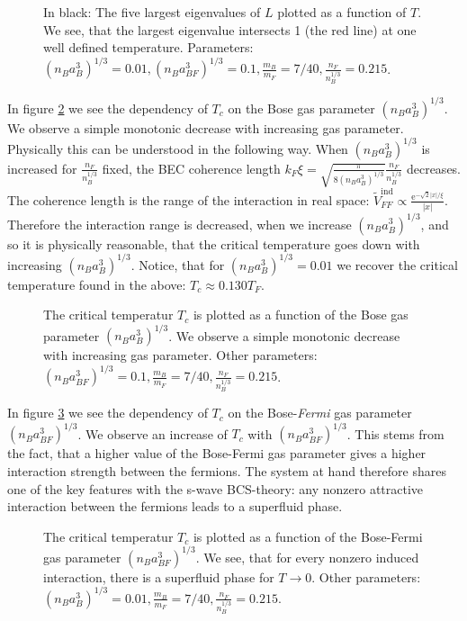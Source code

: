 \begin{figure} 
\begin{center}  
  
\caption{In black: The five largest eigenvalues of $L$ plotted as a function of $T$. We see, that the largest eigenvalue intersects 1 (the red line) at one well defined temperature. Parameters: $(n_Ba_{B}^3)^{1/3} = 0.01, (n_Ba_{BF}^3)^{1/3} = 0.1, \frac{m_B}{m_F} = 7/40, \frac{n_F}{n_B^{1/3}} = 0.215$. }
\label{fig.TCeigenvalues}  
\end{center}    
\end{figure}


In figure \ref{fig.TCrB} we see the dependency of $T_c$ on the Bose gas parameter $(n_Ba_B^3)^{1/3}$. We observe a simple monotonic decrease with increasing gas parameter. Physically this can be understood in the following way. When $(n_Ba_B^3)^{1/3}$ is increased for $\frac{n_F}{n_B^{1/3}}$ fixed, the BEC coherence length $k_F\xi = \sqrt{ \frac{\pi}{ 8(n_Ba_B^3)^{1/3} } }\frac{ n_F }{ n_B^{1/3} }$ decreases. The coherence length is the range of the interaction in real space: $\tilde{V}_{FF}^{\text{ind}} \propto \frac{ \text{e}^{ -\sqrt{2}|x|/\xi } } {|x|}$. Therefore the interaction range is decreased, when we increase $(n_Ba_B^3)^{1/3}$, and so it is physically reasonable, that the critical temperature goes down with increasing $(n_Ba_B^3)^{1/3}$. Notice, that for $(n_Ba_{B}^3)^{1/3} = 0.01$ we recover the critical temperature found in the above: $T_c \approx 0.130 T_F$. 

\begin{figure} 
\begin{center}  
  
\caption{The critical temperatur $T_c$ is plotted as a function of the Bose gas parameter $(n_Ba_B^3)^{1/3}$. We observe a simple monotonic decrease with increasing gas parameter. Other parameters: $(n_Ba_{BF}^3)^{1/3} = 0.1, \frac{m_B}{m_F} = 7/40, \frac{n_F}{n_B^{1/3}} = 0.215$. }  
\label{fig.TCrB}  
\end{center}    
\end{figure}

In figure \ref{fig.TCrBF} we see the dependency of $T_c$ on the Bose-\textit{Fermi} gas parameter $(n_Ba_{BF}^3)^{1/3}$. We observe an increase of $T_c$ with $(n_Ba_{BF}^3)^{1/3}$. This stems from the fact, that a higher value of the Bose-Fermi gas parameter gives a higher interaction strength between the fermions. The system at hand therefore shares one of the key features with the s-wave BCS-theory: any nonzero attractive interaction between the fermions leads to a superfluid phase. 

\begin{figure} 
\begin{center}  
  
\caption{The critical temperatur $T_c$ is plotted as a function of the Bose-Fermi gas parameter $(n_Ba_{BF}^3)^{1/3}$. We see, that for every nonzero induced interaction, there is a superfluid phase for $T\to 0$. Other parameters: $(n_Ba_{B}^3)^{1/3} = 0.01, \frac{m_B}{m_F} = 7/40, \frac{n_F}{n_B^{1/3}} = 0.215$. }  
\label{fig.TCrBF}  
\end{center}    
\end{figure}



